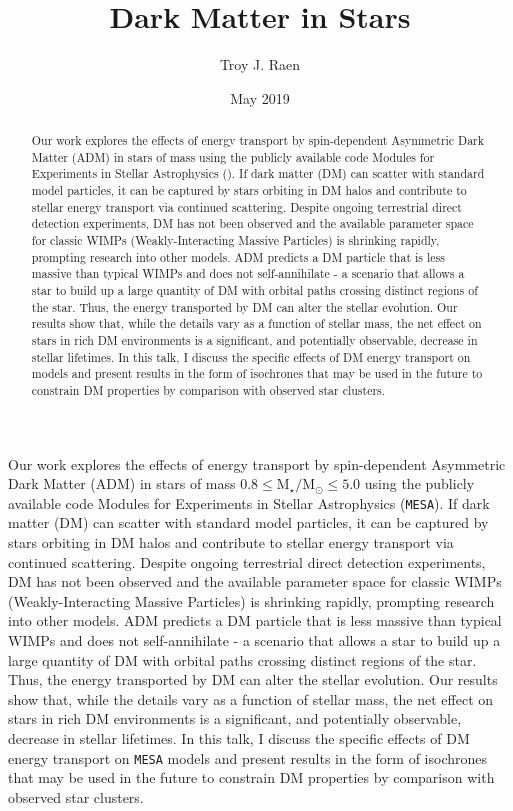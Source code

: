 \documentclass{article}
\title{Dark Matter in Stars}
\author{Troy J. Raen}
\date{May 2019}
\begin{document}
\maketitle


\begin{abstract}

  Our work explores the effects of energy transport by spin-dependent Asymmetric Dark Matter (ADM) in stars of mass  using the publicly available code Modules for Experiments in Stellar Astrophysics (\mesa). If dark matter (DM) can scatter with standard model particles, it can be captured by stars orbiting in DM halos and contribute to stellar energy transport via continued scattering. Despite ongoing terrestrial direct detection experiments, DM has not been observed and the available parameter space for classic WIMPs (Weakly-Interacting Massive Particles) is shrinking rapidly, prompting research into other models. ADM predicts a DM particle that is less massive than typical WIMPs and does not self-annihilate - a scenario that allows a star to build up a large quantity of DM with orbital paths crossing distinct regions of the star. Thus, the energy transported by DM can alter the stellar evolution. Our results show that, while the details vary as a function of stellar mass, the net effect on stars in rich DM environments is a significant, and potentially observable, decrease in stellar lifetimes. In this talk, I discuss the specific effects of DM energy transport on \mesa models and present results in the form of isochrones that may be used in the future to constrain DM properties by comparison with observed star clusters.

\end{abstract}

Our work explores the effects of energy transport by spin-dependent Asymmetric Dark Matter (ADM) in stars of mass $0.8 \leq \mathrm{M}_{\star}/\mathrm{M}_{\odot} \leq 5.0$ using the publicly available code Modules for Experiments in Stellar Astrophysics (\texttt{MESA}). If dark matter (DM) can scatter with standard model particles, it can be captured by stars orbiting in DM halos and contribute to stellar energy transport via continued scattering. Despite ongoing terrestrial direct detection experiments, DM has not been observed and the available parameter space for classic WIMPs (Weakly-Interacting Massive Particles) is shrinking rapidly, prompting research into other models. ADM predicts a DM particle that is less massive than typical WIMPs and does not self-annihilate - a scenario that allows a star to build up a large quantity of DM with orbital paths crossing distinct regions of the star. Thus, the energy transported by DM can alter the stellar evolution. Our results show that, while the details vary as a function of stellar mass, the net effect on stars in rich DM environments is a significant, and potentially observable, decrease in stellar lifetimes. In this talk, I discuss the specific effects of DM energy transport on \texttt{MESA} models and present results in the form of isochrones that may be used in the future to constrain DM properties by comparison with observed star clusters.
\end{document}
